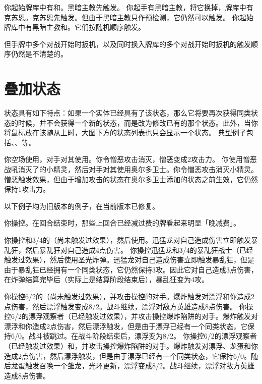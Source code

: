 \example 你起始牌库中有和。黑暗主教先触发。
\example 你起手有黑暗主教，将它换掉，牌库中有克苏恩。克苏恩先触发。但由于黑暗主教只作预检测，它仍然可以触发。
\example 你起始牌库中有黑暗主教和。它们按随机顺序触发。

但手牌中多个对战开始时扳机，以及同时换入牌库的多个对战开始时扳机的触发顺序仍然是不清楚的。

\section{叠加状态}

 状态具有如下特点：如果一个实体已经具有了该状态，那么它将要再次获得同类状态的时候，并不会获得一个新的状态，而是改为修改已有的那个状态。此外，当你将鼠标放在该随从上时，大图下方的状态列表也只会显示一个状态。
\example 典型例子包括、、等。

\example 你空场使用，对手对其使用。你令憎恶攻击消灭，憎恶变成2攻击力。
\example 你使用憎恶战吼消灭了的小精灵，然后对手对其使用奥尔多卫士。你令憎恶攻击消灭小精灵。憎恶触发效果，但由于增加攻击的状态在奥尔多卫士添加的状态之前生效，它仍然保持1攻击力。

以下例子均为旧版本的例子，在当前版本已修复。

\example 你操控。在回合结束时，那些上回合已经减过费的牌看起来明显「晚减费」。

\example 你操控和3/4的（尚未触发过效果），然后使用。迅猛龙对自己造成伤害立即触发暴乱狂，然后暴乱狂对自己造成4点伤害。
\example 你操控迅猛龙和3/4的暴乱狂战士（已经触发过效果），然后使用圣光炸弹。迅猛龙对自己造成伤害立即触发暴乱狂，但是由于暴乱狂已经拥有一个同类状态，它仍然保持3攻。因此它对自己造成3点伤害，在炸弹结算完毕后（实际上是结算阶段结束后），暴乱狂变为4攻。

\example 你操控6/2的（尚未触发过效果），并攻击操控的对手。爆炸触发对漂浮和你造成2点伤害，然后漂浮触发变成8/2。战斗继续，漂浮对敌方英雄造成8点伤害。
\example 你操控6/2的漂浮观察者（已经触发过效果），并攻击操控爆炸陷阱的对手。爆炸触发对漂浮和你造成2点伤害，然后漂浮触发，但是由于漂浮已经有一个同类状态，它保持6/0。战斗被跳过。在战斗阶段结束后，漂浮变为8/2。
\example 你操控6/2的漂浮观察者（已经触发过效果）和，并攻击操控爆炸陷阱的对手。爆炸触发对漂浮、龙蛋和你造成2点伤害，然后漂浮触发，但是由于漂浮已经有一个同类状态，它保持6/0。随后龙蛋触发召唤一个雏龙，光环更新，漂浮变成8/2。战斗继续，漂浮对敌方英雄造成8点伤害。

